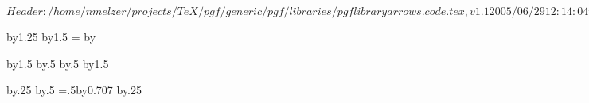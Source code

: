 \ProvidesPackageRCS $Header: /home/nmelzer/projects/TeX/pgf/generic/pgf/libraries/pgflibraryarrows.code.tex,v 1.1 2005/06/29 12:14:04 tantau Exp $

%



\pgfarrowsdeclare{[}{]}
{
  \@tempdima=1pt%
  \advance\@tempdima by1.25\pgflinewidth%
  \pgfarrowsleftextend{-\@tempdima}
  \pgfarrowsrightextend{.5\pgflinewidth}
}
{
  \@tempdima=2pt%
  \advance\@tempdima by1.5\pgflinewidth%
  \@tempdimb=\@tempdima%
  \advance\@tempdimb by\pgflinewidth%
  \pgfsetdash{}{0pt}
  \pgfsetmiterjoin
  \pgfsetbuttcap
  \pgfpathlineto{\pgfpoint{0pt}{-\@tempdima}}
  \pgfpathlineto{\pgfpoint{0pt}{\@tempdima}}
  \pgfusepathqstroke
}

\pgfarrowsdeclarereversed{]}{[}{[}{]}



\pgfarrowsdeclare{(}{)}
{
  \@tempdima=2pt%
  \advance\@tempdima by1.5\pgflinewidth%
  \@tempdima\advance\@tempdimb by.5\pgflinewidth%
  \pgfarrowsrightextend{\@tempdimb}
  \@tempdima\advance\@tempdimb by.5\pgflinewidth%
  \pgfarrowsleftextend{-\@tempdimb}
}
{
  \@tempdima=2pt%
  \advance\@tempdima by1.5\pgflinewidth%
  \pgfsetdash{}{0pt}
  \pgfsetroundcap
  \pgfpathcurveto
  {}
  {}
  {}
  \pgfusepathqstroke
}

\pgfarrowsdeclarereversed{)}{(}{(}{)}





{
  \@tempdima=0.3pt%
  \advance\@tempdima by.25\pgflinewidth%
  \@tempdima\advance\@tempdimb by.5\pgflinewidth%
  \pgfarrowsleftextend{-\@tempdimb}
  \@tempdimb=.5\@tempdima\advance\@tempdimb by0.707\pgflinewidth%
  \pgfarrowsrightextend{\@tempdimb}
}
{
  \@tempdima=0.3pt%
  \advance\@tempdima by.25\pgflinewidth%
  \pgfsetdash{}{0pt}
  \pgfsetroundcap
  \pgfsetmiterjoin
  \pgfusepathqstroke
}

